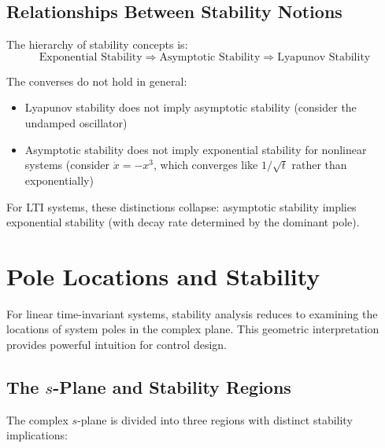 
\subsection{Relationships Between Stability Notions}

The hierarchy of stability concepts is:
\begin{equation}
\text{Exponential Stability} \Rightarrow \text{Asymptotic Stability} \Rightarrow \text{Lyapunov Stability}
\end{equation}

The converses do not hold in general:
\begin{itemize}
    \item Lyapunov stability does not imply asymptotic stability (consider the undamped oscillator)
    \item Asymptotic stability does not imply exponential stability for nonlinear systems (consider $\dot{x} = -x^3$, which converges like $1/\sqrt{t}$ rather than exponentially)
\end{itemize}

For LTI systems, these distinctions collapse: asymptotic stability implies exponential stability (with decay rate determined by the dominant pole).

\section{Pole Locations and Stability}
\label{sec:pole_locations}

For linear time-invariant systems, stability analysis reduces to examining the locations of system poles in the complex plane. This geometric interpretation provides powerful intuition for control design.

\subsection{The $s$-Plane and Stability Regions}

The complex $s$-plane is divided into three regions with distinct stability implications:

